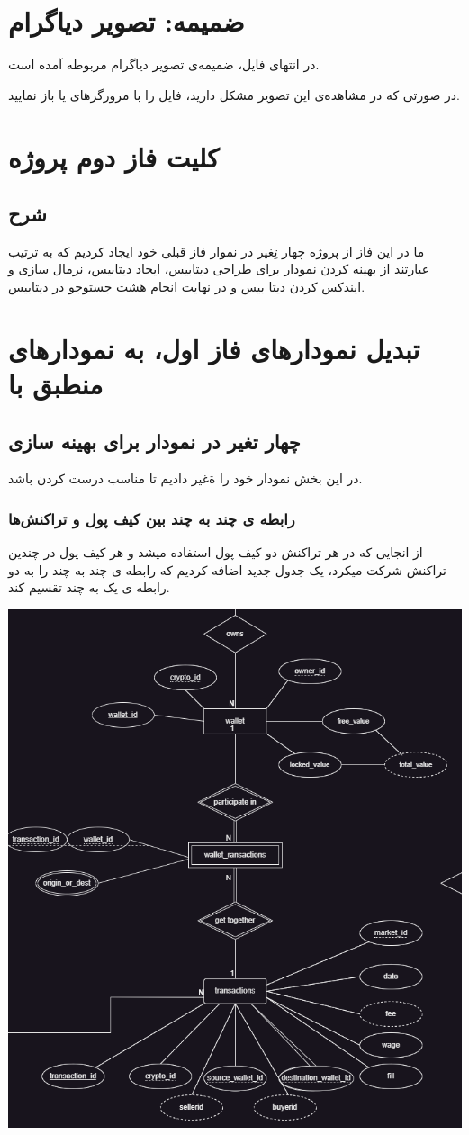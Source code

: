 \documentclass{book}
\begin{document}
\chapter{ضمیمه: تصویر دیاگرام }
در انتهای فایل، ضمیمه‌ی تصویر دیاگرام مربوطه آمده است.

در صورتی که در مشاهده‌ی این تصویر مشکل دارید، فایل  را با مرورگرهای  یا  باز نمایید.


\chapter{کلیت فاز دوم پروژه}
\section{شرح}
ما در این فاز از پروژه چهار تِغیر در نموار فاز قبلی خود ایجاد کردیم که به ترتیب عبارتند از بهینه کردن نمودار برای طراحی دیتابیس، ایجاد دیتابیس، نرمال سازی و ایندکس کردن دیتا بیس و در نهایت انجام هشت جستوجو در دیتابیس.
\chapter{تبدیل نمودار‌های‌‌ فاز اول، به نمودار‌های منطبق با }
\section{چهار تغیر در نمودار برای بهینه سازی}
در این بخش نمودار خود را ةغیر دادیم تا مناسب درست کردن  باشد.
\newpage

\subsection{رابطه ی چند به چند بین کیف پول و تراکنش‌ها}
از انجایی که در هر تراکنش دو کیف پول استفاده میشد و هر کیف پول در چندین تراکنش شرکت میکرد، یک جدول جدید اضافه کردیم که رابطه ی چند به چند را به دو رابطه ی یک به چند تقسیم کند.

\includegraphics[width=0.8\linewidth]{wallets_transactions.png}
\newpage
\end{document}
